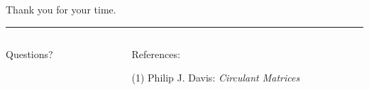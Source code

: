 \documentclass[mathserif
, handout
]{beamer}
\begin{document}
\begin{frame}
    \begin{flushright}
        {\color{black!20!palettelight}Thank you for your time.}
        \end{flushright}
        \hrule\pause
    \begin{columns}
    \begin{column}{0.3\textwidth}
        \begin{block}{}{
        \begin{center}\Large  Questions?\end{center}}
        \end{block}\vspace{0em}
    \end{column}
    \begin{column}{0.7\textwidth}
        \begin{block}{}{
        \begin{center}\Large  References:\end{center}}
    \end{block}
(1) Philip J. Davis: \textit{Circulant Matrices}
    \end{column}
    \end{columns}
\end{frame}







\end{document}

